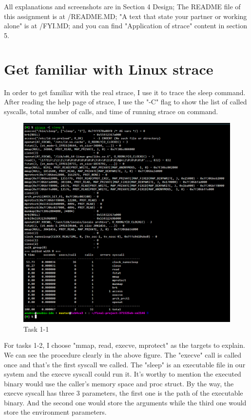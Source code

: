 \documentclass[11pt,oneside,a4paper]{article}
\begin{document}
All explanations and screenshots are in Section 4 Design;
The README file of this assignment is at /README.MD;
"A text that state your partner or working alone" is at /FYI.MD;
and you can find "Application of strace" content in section 5.

\section{Get familiar with Linux strace}
In order to get familiar with the real strace, I use it to trace the sleep command.
After reading the help page of strace, I use the "-C" flag to show the list of called
syscalls, total number of calls, and time of running strace on command.

\begin{figure}[H]
    \includegraphics[width=4.75in]{1-3.png}
    \centering
    \caption{Task 1-1}
\end{figure}

For tasks 1-2, I choose "mmap, read, execve, mprotect" as the targets to explain. We can
see the procedure clearly in the above figure. The "execve" call is called once and 
that's the first syscall we called. The "sleep" is an executable file in our system
and the execve syscall could run it. It's worthy to mention the executed binary would 
use the caller's memory space and proc struct. By the way, the execve syscall has three
3 parameters, the first one is the path of the executable binary. And the second one
would store the arguments while the third one would store the environment parameters.
\end{document}
